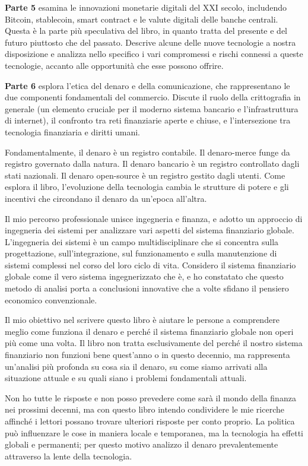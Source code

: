 \documentclass[
  a5paper,
  smalldemyvopaper,10pt,twoside,onecolumn,openright,extrafontsizes,hidelinks]{memoir}
\begin{document}
\textbf{Parte 5} esamina le innovazioni monetarie digitali del XXI
secolo, includendo Bitcoin, stablecoin, smart contract e le valute
digitali delle banche centrali. Questa è la parte più speculativa del
libro, in quanto tratta del presente e del futuro piuttosto che del
passato. Descrive alcune delle nuove tecnologie a nostra disposizione e
analizza nello specifico i vari compromessi e rischi connessi a queste
tecnologie, accanto alle opportunità che esse possono offrire.

\textbf{Parte 6} esplora l'etica del denaro e della comunicazione, che
rappresentano le due componenti fondamentali del commercio. Discute il
ruolo della crittografia in generale (un elemento cruciale per il
moderno sistema bancario e l'infrastruttura di internet), il confronto
tra reti finanziarie aperte e chiuse, e l'intersezione tra tecnologia
finanziaria e diritti umani.

Fondamentalmente, il denaro è un registro contabile. Il denaro-merce
funge da registro governato dalla natura. Il denaro bancario è un
registro controllato dagli stati nazionali. Il denaro open-source è un
registro gestito dagli utenti. Come esplora il libro, l'evoluzione della
tecnologia cambia le strutture di potere e gli incentivi che circondano
il denaro da un'epoca all'altra.

Il mio percorso professionale unisce ingegneria e finanza, e adotto un
approccio di ingegneria dei sistemi per analizzare vari aspetti del
sistema finanziario globale. L'ingegneria dei sistemi è un campo
multidisciplinare che si concentra sulla progettazione,
sull'integrazione, sul funzionamento e sulla manutenzione di sistemi
complessi nel corso del loro ciclo di vita. Considero il sistema
finanziario globale come il vero sistema ingegnerizzato che è, e ho
constatato che questo metodo di analisi porta a conclusioni innovative
che a volte sfidano il pensiero economico convenzionale.

Il mio obiettivo nel scrivere questo libro è aiutare le persone a
comprendere meglio come funziona il denaro e perché il sistema
finanziario globale non operi più come una volta. Il libro non tratta
esclusivamente del perché il nostro sistema finanziario non funzioni
bene quest'anno o in questo decennio, ma rappresenta un'analisi più
profonda su cosa sia il denaro, su come siamo arrivati alla situazione
attuale e su quali siano i problemi fondamentali attuali.

Non ho tutte le risposte e non posso prevedere come sarà il mondo della
finanza nei prossimi decenni, ma con questo libro intendo condividere le
mie ricerche affinché i lettori possano trovare ulteriori risposte per
conto proprio. La politica può influenzare le cose in maniera locale e
temporanea, ma la tecnologia ha effetti globali e permanenti; per questo
motivo analizzo il denaro prevalentemente attraverso la lente della
tecnologia.
\end{document}
